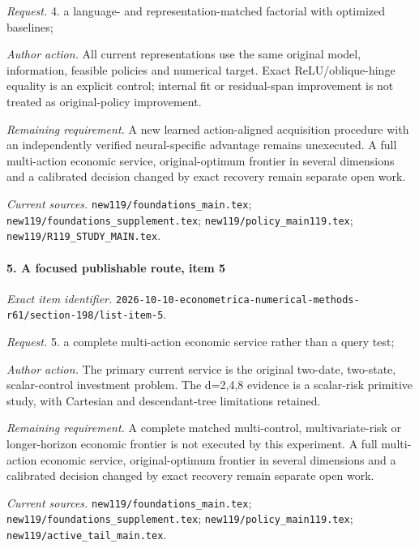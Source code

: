 \par\emph{Request.} 4. a language- and representation-matched factorial with optimized baselines;

\par\emph{Author action.} All current representations use the same original model, information, feasible policies and numerical target. Exact ReLU/\allowbreak{}oblique-hinge equality is an explicit control; internal fit or residual-span improvement is not treated as original-policy improvement.

\par\emph{Remaining requirement.} A new learned action-aligned acquisition procedure with an independently verified neural-specific advantage remains unexecuted. A full multi-action economic service, original-optimum frontier in several dimensions and a calibrated decision changed by exact recovery remain separate open work.

\par\emph{Current sources.} \nolinkurl{new119/foundations_main.tex}; \nolinkurl{new119/foundations_supplement.tex}; \nolinkurl{new119/policy_main119.tex}; \nolinkurl{new119/R119_STUDY_MAIN.tex}.

\paragraph{5. A focused publishable route, item 5}

\emph{Exact item identifier.} \nolinkurl{2026-10-10-econometrica-numerical-methods-r61/section-198/list-item-5}.

\par\emph{Request.} 5. a complete multi-action economic service rather than a query test;

\par\emph{Author action.} The primary current service is the original two-date, two-state, scalar-control investment problem. The d=2,4,8 evidence is a scalar-risk primitive study, with Cartesian and descendant-tree limitations retained.

\par\emph{Remaining requirement.} A complete matched multi-control, multivariate-risk or longer-horizon economic frontier is not executed by this experiment. A full multi-action economic service, original-optimum frontier in several dimensions and a calibrated decision changed by exact recovery remain separate open work.

\par\emph{Current sources.} \nolinkurl{new119/foundations_main.tex}; \nolinkurl{new119/foundations_supplement.tex}; \nolinkurl{new119/policy_main119.tex}; \nolinkurl{new119/active_tail_main.tex}.

